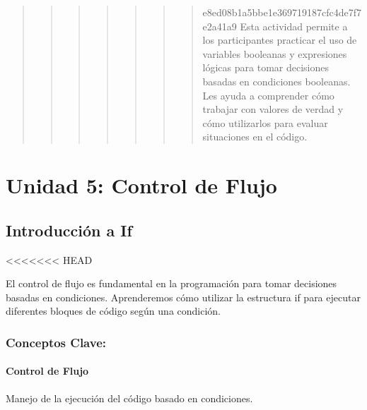 \documentclass[
  a4paper,
  DIV=11,
  numbers=noendperiod,
  onepage,
  openany]{scrreprt}
\begin{document}
\begin{quote}
\begin{quote}
\begin{quote}
\begin{quote}
\begin{quote}
\begin{quote}
\begin{quote}
e8ed08b1a5bbe1e369719187cfc4de7f7e2a41a9 Esta actividad permite a los
participantes practicar el uso de variables booleanas y expresiones
lógicas para tomar decisiones basadas en condiciones booleanas. Les
ayuda a comprender cómo trabajar con valores de verdad y cómo
utilizarlos para evaluar situaciones en el código.
\end{quote}
\end{quote}
\end{quote}
\end{quote}
\end{quote}
\end{quote}
\end{quote}

\part{Unidad 5: Control de Flujo}

\hypertarget{introducciuxf3n-a-if}{%
\chapter{Introducción a If}\label{introducciuxf3n-a-if}}

\textless\textless\textless\textless\textless\textless\textless{} HEAD

El control de flujo es fundamental en la programación para tomar
decisiones basadas en condiciones. Aprenderemos cómo utilizar la
estructura if para ejecutar diferentes bloques de código según una
condición.

\hypertarget{conceptos-clave-28}{%
\section{Conceptos Clave:}\label{conceptos-clave-28}}

\hypertarget{control-de-flujo}{%
\subsection{Control de Flujo}\label{control-de-flujo}}

Manejo de la ejecución del código basado en condiciones.
\end{document}
